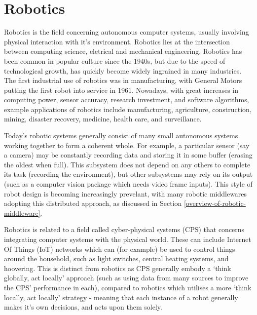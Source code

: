 \documentclass[../dissertation.tex]{subfiles}
\begin{document}
\section{Robotics}

Robotics is the field concerning autonomous computer systems, usually involving physical interaction with it's environment. Robotics lies at the intersection between computing science, eletrical and mechanical engineering. Robotics has been common in popular culture since the 1940s\cite{hockstein2007history}, but due to the speed of technological growth, has quickly become widely ingrained in many industries. The first industrial use of robotics was in manufacturing, with General Motors putting the first robot into service in 1961\cite{hagele2016ashorthistory}. Nowadays, with great increases in computing power, sensor accuracy, research investment, and software algorithms, example applications of robotics include manufacturing, agriculture, construction, mining, disaster recovery, medicine, health care, and surveillance\cite{hagele2016robotsatwork}.

Today's robotic systems generally consist of many small autonomous systems working together to form a coherent whole\cite{4058987}. For example, a particular sensor (say a camera) may be constantly recording data and storing it in some buffer (erasing the oldest when full). This subsystem does not depend on any others to complete its task (recording the environment), but other subsystems may rely on its output (such as a computer vision package which needs video frame inputs). This style of robot design is becoming increasingly prevelant, with many robotic middlewares adopting this distributed approach, as discussed in Section \ref{overview-of-robotic-middleware}.

Robotics is related to a field called cyber-physical systems (CPS) that concerns integrating computer systems with the physical world\cite{Lee:EECS-2008-8}. These can include Internet Of Things (IoT) networks\cite{atzori2010internet} which can (for example) be used to control things around the household, such as light switches, central heating systems, and hoovering. This is distinct from robotics as CPS generally embody a `think globally, act locally' approach\cite{gordonthink} (such as using data from many sources to improve the CPS' performance in each), compared to robotics which utilises a more `think locally, act locally' strategy - meaning that each instance of a robot generally makes it's own decisions, and acts upon them solely.
\end{document}
